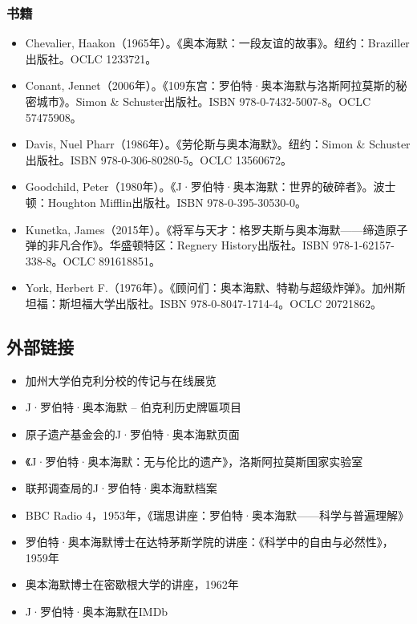 \subsubsection{书籍}
\begin{itemize}
\item Chevalier, Haakon（1965年）。《奥本海默：一段友谊的故事》。纽约：Braziller出版社。OCLC 1233721。
\item Conant, Jennet（2006年）。《109东宫：罗伯特·奥本海默与洛斯阿拉莫斯的秘密城市》。Simon & Schuster出版社。ISBN 978-0-7432-5007-8。OCLC 57475908。
\item Davis, Nuel Pharr（1986年）。《劳伦斯与奥本海默》。纽约：Simon & Schuster出版社。ISBN 978-0-306-80280-5。OCLC 13560672。
\item Goodchild, Peter（1980年）。《J·罗伯特·奥本海默：世界的破碎者》。波士顿：Houghton Mifflin出版社。ISBN 978-0-395-30530-0。
\item Kunetka, James（2015年）。《将军与天才：格罗夫斯与奥本海默——缔造原子弹的非凡合作》。华盛顿特区：Regnery History出版社。ISBN 978-1-62157-338-8。OCLC 891618851。
\item York, Herbert F.（1976年）。《顾问们：奥本海默、特勒与超级炸弹》。加州斯坦福：斯坦福大学出版社。ISBN 978-0-8047-1714-4。OCLC 20721862。
\end{itemize}
\subsection{外部链接}
\begin{itemize}
\item 加州大学伯克利分校的传记与在线展览
\item J·罗伯特·奥本海默 – 伯克利历史牌匾项目
\item 原子遗产基金会的J·罗伯特·奥本海默页面
\item 《J·罗伯特·奥本海默：无与伦比的遗产》，洛斯阿拉莫斯国家实验室
\item 联邦调查局的J·罗伯特·奥本海默档案
\item BBC Radio 4，1953年，《瑞思讲座：罗伯特·奥本海默——科学与普遍理解》
\item 罗伯特·奥本海默博士在达特茅斯学院的讲座：《科学中的自由与必然性》，1959年
\item 奥本海默博士在密歇根大学的讲座，1962年
\item J·罗伯特·奥本海默在IMDb
\end{itemize}